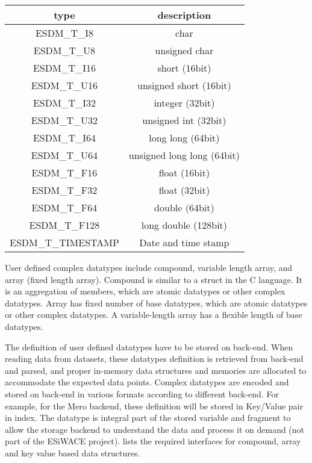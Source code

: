 \begin{center}
	\begin{tabular}{|c|c|}
		\hline
		type & description \\
		\hline
		ESDM\_T\_I8     & char                           \\
		ESDM\_T\_U8    & unsigned char                  \\
		ESDM\_T\_I16    & short (16bit)                  \\
		ESDM\_T\_U16   & unsigned short (16bit)         \\
		ESDM\_T\_I32      & integer (32bit)                \\
		ESDM\_T\_U32     & unsigned int (32bit)           \\
		ESDM\_T\_I64    & long long (64bit)              \\
		ESDM\_T\_U64   & unsigned long long (64bit)     \\
		ESDM\_T\_F16    & float (16bit)                  \\
		ESDM\_T\_F32    & float (32bit)                  \\
		ESDM\_T\_F64   & double (64bit)                 \\
		ESDM\_T\_F128 & long double (128bit)           \\
		ESDM\_T\_TIMESTAMP & Date and time stamp \\
		\hline
	\end{tabular}
\end{center}

User defined complex datatypes include compound, variable length array,
and array (fixed length array).
Compound is similar to a struct in the C language.
It is an aggregation of members, which are atomic datatypes or other complex
datatypes.
Array has fixed number of base datatypes, which are atomic datatypes
or other complex datatypes.
A variable-length array has a flexible length of base datatypes.

The definition of user defined datatypes have to be stored on back-end. When
reading data from datasets, these datatypes definition is retrieved from back-end
and parsed, and proper in-memory data structures and memories are allocated to
accommodate the expected data points.
Complex datatypes are encoded and stored on back-end in various formats according
to different back-end.
For example, for the Mero backend, these definition will be stored in Key/Value pair in index.
The datatype is integral part of the stored variable and fragment to allow the storage backend to understand the data and process it on demand (not part of the ESiWACE project).
 lists the required interfaces for compound, array and key value based data structures.



